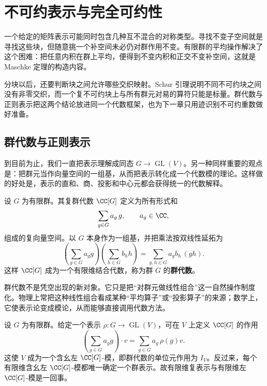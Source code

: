 \section{不可约表示与完全可约性}
\label{chap:schur-maschke}

一个给定的矩阵表示可能同时包含几种互不混合的对称类型。寻找不变子空间就是寻找这些块，但随意挑一个补空间未必仍对群作用不变。有限群的平均操作解决了这个困难：把任意内积在群上平均，便得到不变内积和正交不变补空间，这就是 Maschke 定理的构造内容。

分块以后，还要判断块之间允许哪些交织映射。Schur 引理说明不同不可约块之间没有非零交织，而一个复不可约块上与所有群元对易的算符只能是标量。群代数与正则表示把这两个结论放进同一个代数框架，也为下一章只用迹识别不可约重数做好准备。

\subsection{群代数与正则表示}
\label{sec:group-algebra-regular}


到目前为止，我们一直把表示理解成同态 $G\to \operatorname{GL}(V)$。另一种同样重要的观点是：把群元当作向量空间的一组基，从而把表示转化成一个代数模的理论。这样做的好处是，表示的直和、商、投影和中心元都会获得统一的代数解释。

\begin{definition}[群代数]
设 $G$ 为有限群。其复群代数 $\CC[G]$ 定义为所有形式和
\[
\sum_{g\in G} a_g\,g,
\qquad a_g\in\CC,
\]
组成的复向量空间。以 $G$ 本身作为一组基，并把乘法按双线性延拓为
\[
\left(\sum_{g\in G}a_g g\right)
\left(\sum_{h\in G}b_h h\right)
=\sum_{g,h\in G}a_g b_h\,(gh).
\]
这样 $\CC[G]$ 成为一个有限维结合代数，称为群 $G$ 的\textbf{群代数}。
\label{def:group-algebra}
\end{definition}

群代数不是凭空出现的新对象。它只是把“对群元做线性组合”这一自然操作制度化。物理上常把这种线性组合看成某种“平均算子”或“投影算子”的来源；数学上，它使表示论变成模论，从而能够直接调用代数方法。

\begin{proposition}[表示与群代数模的对应]
设 $G$ 为有限群。给定一个表示 $\rho:G\to \operatorname{GL}(V)$，可在 $V$ 上定义 $\CC[G]$ 的作用
\[
\left(\sum_{g\in G}a_g g\right)\cdot v
=\sum_{g\in G}a_g\,\rho(g)v.
\]
这使 $V$ 成为一个含幺左 $\CC[G]$-模，即群代数的单位元作用为 $I_V$。反过来，每个有限维含幺左 $\CC[G]$-模都唯一确定一个群表示。故有限维复表示与有限维左 $\CC[G]$-模是一回事。
\label{prop:group-algebra-module}

\end{proposition}

